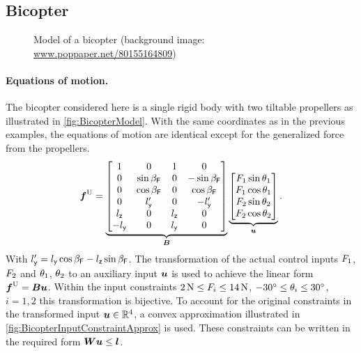 \subsection{Bicopter}

\begin{figure}[ht]
 \centering
 
 \caption{Model of a bicopter (background image: \url{www.poppaper.net/80155164809})}
 \label{fig:BicopterModel}
\end{figure}

\paragraph{Equations of motion.}
The bicopter considered here is a single rigid body with two tiltable propellers as illustrated in \autoref{fig:BicopterModel}.
With the same coordinates as in the previous examples, the equations of motion are identical except for the generalized force from the propellers.
\begin{align}
 \genForceInput
 =
 \underbrace{\begin{bmatrix}
  1 & 0 & 1 & 0 \\
  0 & \sin\PropInc & 0 & -\sin\PropInc \\
  0 & \cos\PropInc & 0 & \cos\PropInc \\
  0 & \PropPosY' & 0 & -\PropPosY' \\
  \PropPosZ & 0 & \PropPosZ & 0 \\
  -\PropPosY & 0 & \PropPosY & 0 \\
 \end{bmatrix}}_{\sysInputMat}
 \underbrace{\begin{bmatrix} \PropForce[1] \sin\PropTilt[1] \\ \PropForce[1] \cos\PropTilt[1] \\ \PropForce[2] \sin\PropTilt[2] \\ \PropForce[2] \cos\PropTilt[2] \end{bmatrix}}_{\sysInput}
 .
\end{align}
With $\PropPosY' = \PropPosY \cos\PropInc - \PropPosZ \sin\PropInc$.
The transformation of the actual control inputs $\PropForce[1]$, $\PropForce[2]$ and $\PropTilt[1]$, $\PropTilt[2]$ to an auxiliary input $\sysInput$ is used to achieve the linear form $\genForceInput = \sysInputMat\sysInput$.
Within the input constraints $2\,\unit{N} \leq \PropForce[i] \leq 14\,\unit{N}$, $-30^\circ \leq \PropTilt[i] \leq 30^\circ$, $i=1,2$ this transformation is bijective.
To account for the original constraints in the transformed input $\sysInput\in \RealNum^4$, a convex approximation illustrated in \autoref{fig:BicopterInputConstraintApprox} is used.
These constraints can be written in the required form $\sysInputConstMat \sysInput \leq \sysInputConstVec$.

